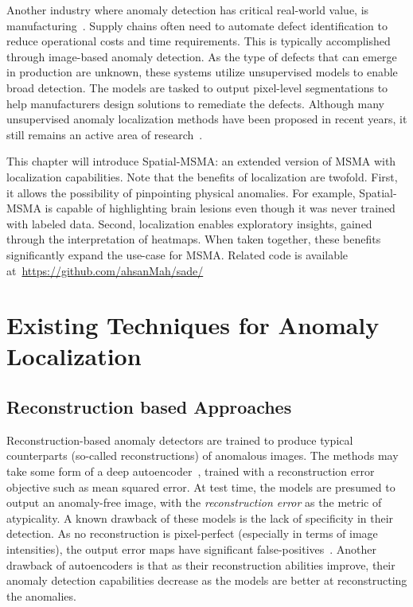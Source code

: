 Another industry where anomaly detection has critical real-world value, is manufacturing~\cite{Bergmann_2019_CVPR}. Supply chains often need to automate defect identification to reduce operational costs and time requirements. This is typically accomplished through image-based anomaly detection. As the type of defects that can emerge in production are unknown, these systems utilize unsupervised models to enable broad detection. The models are tasked to output pixel-level segmentations to help manufacturers design solutions to remediate the defects. Although many unsupervised anomaly localization methods have been proposed in recent years, it still remains an active area of research~\cite{liu2024deep}. 


This chapter will introduce Spatial-MSMA: an extended version of MSMA with localization capabilities. Note that the benefits of localization are twofold. First, it allows the possibility of pinpointing physical anomalies. For example, Spatial-MSMA is capable of highlighting brain lesions even though it was never trained with labeled data. Second, localization enables exploratory insights, gained through the interpretation of heatmaps.
When taken together, these benefits significantly expand the use-case for MSMA. Related code is available at~\url{https://github.com/ahsanMah/sade/}


\section{Existing Techniques for Anomaly Localization}

\subsection*{Reconstruction based Approaches}
Reconstruction-based anomaly detectors are trained to produce typical counterparts (so-called reconstructions) of anomalous images. The methods may take some form of a deep autoencoder~\cite{dae-kascenas22a,baur2021}, trained with a reconstruction error objective such as mean squared error. At test time, the models are presumed to output an anomaly-free image, with the \textit{reconstruction error} as the metric of atypicality. A known drawback of these models is the lack of specificity in their detection. As no reconstruction is pixel-perfect (especially in terms of image intensities), the output error maps have significant false-positives~\cite{baur2021}. Another drawback of autoencoders is that as their reconstruction abilities improve, their anomaly detection capabilities decrease as the models are better at reconstructing the anomalies.

